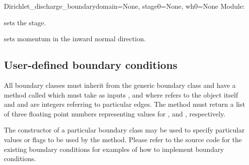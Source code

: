 \documentclass{manual}
\begin{document}
\begin{classdesc}{Dirichlet_discharge_boundary}{domain=None, stage0=None, wh0=None}
Module: 

 sets the stage.

 sets momentum in the inward normal direction.
\end{classdesc}

\subsection{User-defined boundary conditions}
\label{sec:roll your own}

All boundary classes must inherit from the generic boundary class
 and have a method called  which must
take as inputs ,  and  where  refers to the
object itself and  and  are integers referring to
particular edges. The method must return a list of three floating point
numbers representing values for ,
 and , respectively.

The constructor of a particular boundary class may be used to specify
particular values or flags to be used by the  method.
Please refer to the source code for the existing boundary conditions
for examples of how to implement boundary conditions.
\end{document}
